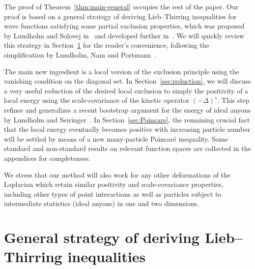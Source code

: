 \documentclass[10pt]{amsart}
\theoremstyle{definition}\newtheorem{defi}[theo]{Definition}\newtheorem{rema}[theo]{Remark}\newtheorem{exam}[theo]{Example}\newtheorem{exem}[theo]{Example}\newtheorem{nota}[theo]{Notation}
\newcommand\1{{\ensuremath {\mathds 1} }}
\begin{document}

The proof of Theorem~\ref{thm:main-general} occupies the rest of the paper. Our proof is based on a general strategy of deriving Lieb--Thirring inequalities for wave functions satisfying some partial exclusion properties, which was proposed by Lundholm and Solovej in~\cite{LunSol-13a} and developed further in~\cite{FraSei-12,LarLun-18,LunNamPor-16,LunPorSol-15,LunSol-13b,
LunSol-14,LunSei-18,Lundholm-18,Nam-18}. We will quickly review this strategy in Section~\ref{sec:general-strategy} for the reader's convenience, following the simplification by Lundholm, Nam and Portmann~\cite{LunNamPor-16}.

The main new ingredient is a local version of the exclusion principle using the vanishing condition on the diagonal set. In Section~\ref{sec:reduction}, we will discuss a very useful reduction of the desired local exclusion to simply the positivity of a local energy using the scale-covariance of the kinetic operator $(-\Delta)^s$. This step refines and generalizes a recent bootstrap argument for the energy of ideal anyons by Lundholm and Seiringer~\cite{LunSei-18}. In Section~\ref{sec:Poincare}, the remaining crucial fact that the local energy eventually becomes positive with increasing particle number will be settled by means of a new many-particle Poincaré inequality. Some standard and non-standard results on relevant function spaces are collected in the appendices for completeness.

We stress that our method will also work for any other deformations of the Laplacian which retain similar positivity and scale-covariance properties, including other types of point interactions as well as particles subject to intermediate statistics (ideal anyons) in one and two dimensions.



\section{General strategy of deriving Lieb--Thirring inequalities} \label{sec:general-strategy}
\end{document}
